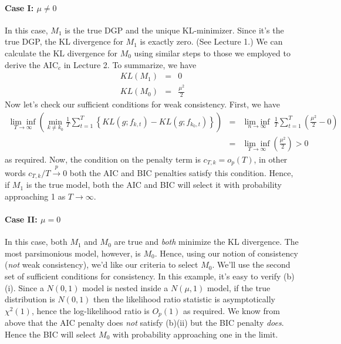\documentclass[12pt]{article}
\theoremstyle{definition}
\begin{document}
\paragraph{Case I: $\mu \neq 0$} In this case, $M_1$ is the true DGP and the unique KL-minimizer. Since it's the true DGP, the KL divergence for $M_1$ is exactly zero. (See Lecture 1.) We can calculate the KL divergence for $M_0$ using similar steps to those we employed to derive the AIC$_c$ in Lecture 2. 
To summarize, we have
	\begin{eqnarray*}
		KL(M_1) &=&0\\
		KL(M_0) &=& \frac{\mu^2}{2}
	\end{eqnarray*}
Now let's check our sufficient conditions for weak consistency. First, we have
	\begin{eqnarray*}
		\underset{T\rightarrow \infty}{\lim\inf}\left(\underset{k \neq k_0}{\min} \frac{1}{T}\sum_{t = 1}^T \left\{ KL(g; f_{k,t}) - KL(g;f_{k_0,t}) \right\} \right) &=& \underset{n\rightarrow \infty}{\lim\inf}\ \frac{1}{T}\sum_{t = 1}^T  \left(\frac{\mu^2}{2} - 0\right) \\
		&=&  \underset{T\rightarrow \infty}{\lim\inf}\left(\frac{\mu^2}{2}\right) >0
	\end{eqnarray*}
as required. Now, the condition on the penalty term is $c_{T,k} = o_p(T)$, in other words $c_{T,k}/T \overset{p}{\rightarrow} 0$ both the AIC and BIC penalties satisfy this condition. Hence, if $M_1$ is the true model, both the AIC and BIC will select it with probability approaching 1 as $T\rightarrow \infty$.

\paragraph{Case II: $\mu = 0$} In this case, both $M_1$ and $M_0$ are true and \emph{both} minimize the KL divergence. The most parsimonious model, however, is $M_0$. Hence, using our notion of consistency (\emph{not} weak consistency), we'd like our criteria to select $M_0$. We'll use the second set of sufficient conditions for consistency. In this example, it's easy to verify (b)(i). Since a $N(0,1)$ model is nested inside a $N(\mu,1)$ model, if the true distribution is $N(0,1)$ then the likelihood ratio statistic is asymptotically $\chi^2(1)$, hence the log-likelihood ratio is $O_p(1)$ as required. We know from above that the AIC penalty does \emph{not} satisfy (b)(ii) but the BIC penalty \emph{does}. Hence the BIC will select $M_0$ with probability approaching one in the limit.
\end{document}
